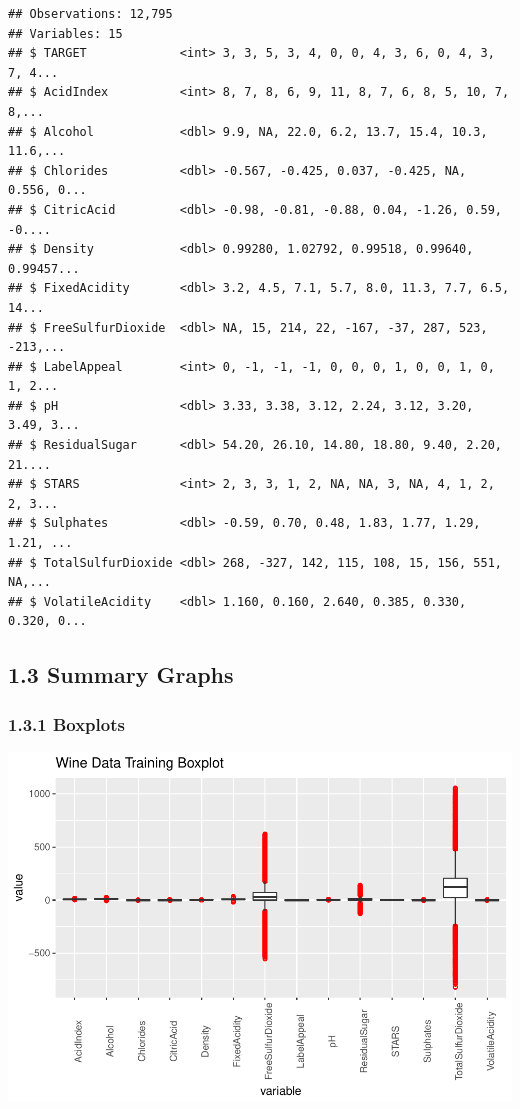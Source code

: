 \documentclass[]{article}
\begin{document}
\begin{verbatim}
## Observations: 12,795
## Variables: 15
## $ TARGET             <int> 3, 3, 5, 3, 4, 0, 0, 4, 3, 6, 0, 4, 3, 7, 4...
## $ AcidIndex          <int> 8, 7, 8, 6, 9, 11, 8, 7, 6, 8, 5, 10, 7, 8,...
## $ Alcohol            <dbl> 9.9, NA, 22.0, 6.2, 13.7, 15.4, 10.3, 11.6,...
## $ Chlorides          <dbl> -0.567, -0.425, 0.037, -0.425, NA, 0.556, 0...
## $ CitricAcid         <dbl> -0.98, -0.81, -0.88, 0.04, -1.26, 0.59, -0....
## $ Density            <dbl> 0.99280, 1.02792, 0.99518, 0.99640, 0.99457...
## $ FixedAcidity       <dbl> 3.2, 4.5, 7.1, 5.7, 8.0, 11.3, 7.7, 6.5, 14...
## $ FreeSulfurDioxide  <dbl> NA, 15, 214, 22, -167, -37, 287, 523, -213,...
## $ LabelAppeal        <int> 0, -1, -1, -1, 0, 0, 0, 1, 0, 0, 1, 0, 1, 2...
## $ pH                 <dbl> 3.33, 3.38, 3.12, 2.24, 3.12, 3.20, 3.49, 3...
## $ ResidualSugar      <dbl> 54.20, 26.10, 14.80, 18.80, 9.40, 2.20, 21....
## $ STARS              <int> 2, 3, 3, 1, 2, NA, NA, 3, NA, 4, 1, 2, 2, 3...
## $ Sulphates          <dbl> -0.59, 0.70, 0.48, 1.83, 1.77, 1.29, 1.21, ...
## $ TotalSulfurDioxide <dbl> 268, -327, 142, 115, 108, 15, 156, 551, NA,...
## $ VolatileAcidity    <dbl> 1.160, 0.160, 2.640, 0.385, 0.330, 0.320, 0...
\end{verbatim}

\hypertarget{summary-graphs}{%
\subsection{1.3 Summary Graphs}\label{summary-graphs}}

\hypertarget{boxplots}{%
\subsubsection{1.3.1 Boxplots}\label{boxplots}}

\includegraphics{DATA_621_Homework_5_files/figure-latex/summary-boxplot-1.pdf}
\end{document}
